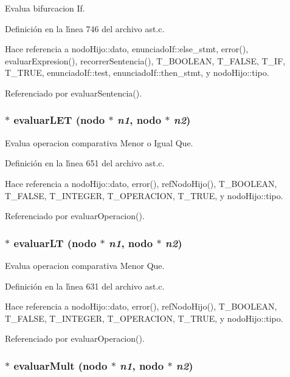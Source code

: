 Evalua bifurcacion If. 



Definici\'{o}n en la l\'{\i}nea 746 del archivo ast.c.

Hace referencia a nodo\-Hijo::dato, enunciado\-If::else\_\-stmt, error(), evaluar\-Expresion(), recorrer\-Sentencia(), T\_\-BOOLEAN, T\_\-FALSE, T\_\-IF, T\_\-TRUE, enunciado\-If::test, enunciado\-If::then\_\-stmt, y nodo\-Hijo::tipo.

Referenciado por evaluar\-Sentencia().
\subsubsection{$\ast$ evaluar\-LET ({\bf nodo} $\ast$ {\em n1}, {\bf nodo} $\ast$ {\em n2})}\label{ast_8h_a47}


Evalua operacion comparativa Menor o Igual Que. 



Definici\'{o}n en la l\'{\i}nea 651 del archivo ast.c.

Hace referencia a nodo\-Hijo::dato, error(), ref\-Nodo\-Hijo(), T\_\-BOOLEAN, T\_\-FALSE, T\_\-INTEGER, T\_\-OPERACION, T\_\-TRUE, y nodo\-Hijo::tipo.

Referenciado por evaluar\-Operacion().
\subsubsection{$\ast$ evaluar\-LT ({\bf nodo} $\ast$ {\em n1}, {\bf nodo} $\ast$ {\em n2})}\label{ast_8h_a46}


Evalua operacion comparativa Menor Que. 



Definici\'{o}n en la l\'{\i}nea 631 del archivo ast.c.

Hace referencia a nodo\-Hijo::dato, error(), ref\-Nodo\-Hijo(), T\_\-BOOLEAN, T\_\-FALSE, T\_\-INTEGER, T\_\-OPERACION, T\_\-TRUE, y nodo\-Hijo::tipo.

Referenciado por evaluar\-Operacion().
\subsubsection{$\ast$ evaluar\-Mult ({\bf nodo} $\ast$ {\em n1}, {\bf nodo} $\ast$ {\em n2})}\label{ast_8h_a52}


